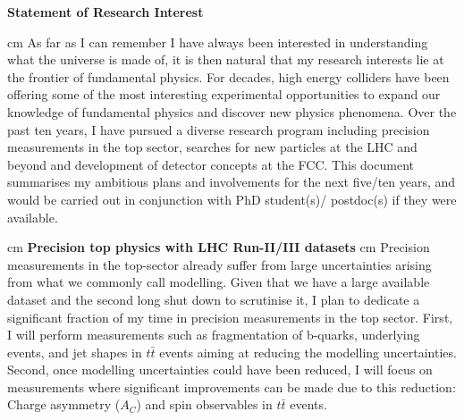 \documentclass[12pt]{article}
\begin{document}
\pagestyle{fancy}
\fancyhf{}

\begin{center}
{\bf \LARGE Statement of Research Interest} \\
\end{center}
 cm
\noindent
As far as I can remember I have always been interested in understanding what the universe is made of, it is then natural that my research interests lie at the frontier of fundamental physics. For decades, high energy colliders have been offering some of the most interesting experimental opportunities to expand our knowledge of fundamental physics and discover new physics phenomena. Over the past ten years, I have pursued a diverse research program including precision measurements in the top sector, searches for new particles at the LHC and beyond and development of detector concepts at the FCC. This document summarises my ambitious plans and involvements for the next five/ten years, and would be carried out in conjunction with PhD student(s)/ postdoc(s) if they were available.

 cm
\noindent
{\bf \Large Precision top physics with LHC Run-II/III datasets}
 cm
\noindent
Precision measurements in the top-sector already suffer from large uncertainties arising from what we commonly call modelling. Given that we have a large available dataset and the second long shut down to scrutinise it, I plan to dedicate a significant fraction of my time in precision measurements in the top sector. First, I will perform measurements such as fragmentation of b-quarks, underlying events, and jet shapes in $t\bar{t}$ events aiming at reducing the modelling uncertainties. Second, once modelling uncertainties could have been reduced, I will focus on measurements where significant improvements can be made due to this reduction: Charge asymmetry ($A_C$) and spin observables in $t\bar{t}$ events.
\end{document}
